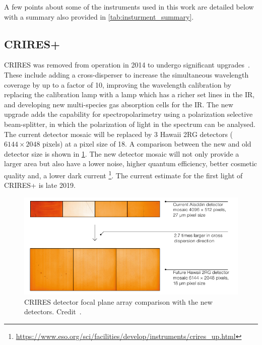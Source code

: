 A few points about some of the \nir{} instruments used in this work are detailed below with a summary also provided in \cref{tab:insturment_summary}.



\subsection{CRIRES+}
\label{subsec:criresplus}
CRIRES was removed from operation in 2014 to undergo significant upgrades~\citep{dorn_crires_2014}.
These include adding a cross-disperser to increase the simultaneous wavelength coverage by up to a factor of 10, improving the wavelength calibration by replacing the \thar{} calibration lamp with a \une{} lamp which has a richer set lines in the IR, and developing new multi-species gas absorption cells for the {IR}.
The new upgrade adds the capability for spectropolarimetry using a polarization selective beam-splitter, in which the polarization of light in the spectrum can be analysed.
The current detector mosaic will be replaced by 3 Hawaii 2RG detectors (\(6144\times 2048\) pixels) at a pixel size of 18\um{}.
A comparison between the new and old detector size is shown in \cref{fig:criresplus_detecotrs}.
The new detector mosaic will not only provide a larger area but also have a lower noise, higher quantum efficiency, better cosmetic quality and, a lower dark current
\footnote{\href{https://www.eso.org/sci/facilities/develop/instruments/crires_up.html}{https://www.eso.org/sci/facilities/develop/instruments/crires\_up.html}}.
The current estimate for the first light of CRIRES+ is late 2019.

\begin{figure}
    \centering
    \includegraphics[width=0.6\linewidth]{figures/spectroscopy/criresplus_detectors.pdf}
    \caption[CRIRES/CRIRES+ detector focal plane arrays.]{CRIRES detector focal plane array comparison with the new detectors.
    Credit~\citet{dorn_crires_2014}.}
    \label{fig:criresplus_detecotrs}
\end{figure}

